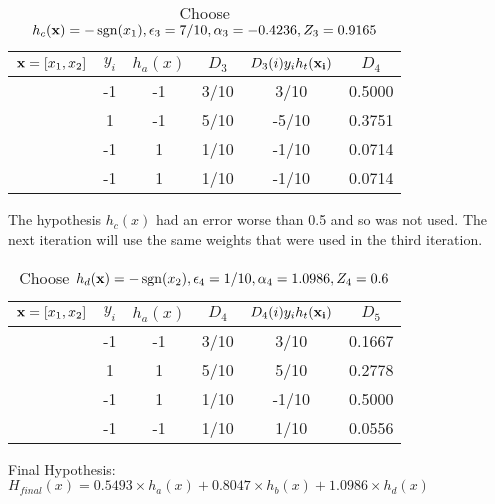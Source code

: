 \begin{table}[H]
  \centering
  \caption{Choose $h_c({\bf x}) = -\operatorname{sgn}(x_1), \epsilon_3 = 7/10, \alpha_3 = -0.4236, Z_3 = 0.9165$}
  \label{tab:Ada1}
  \begin{tabular}{|c|c|c|c|c|c|}
    \hline
    ${\bf x} = [x_1,x_2]$ & $y_i$ & $h_a(x)$ & $D_3$ & $D_{3}(i)y_{i}h_t({\bf x_i})$ & $D_4$ \\ \hline
    [1,1]          &     -1  & -1    & 3/10   & 3/10                          &  0.5000     \\ \hline
    [1,-1]         &    1   & -1    & 5/10   & -5/10                          &    0.3751   \\ \hline
    [-1,-1]        &     -1  & 1    & 1/10   & -1/10                           & 0.0714      \\ \hline
    [-1,1]         &     -1 & 1    & 1/10   & -1/10                           &  0.0714     \\ \hline
  \end{tabular}
\end{table}

The hypothesis $h_c(x)$ had an error worse than 0.5 and so was not used. The next iteration will use the same weights that were used in the third iteration.

\begin{table}[H]
  \centering
  \caption{Choose $h_d({\bf x}) = -\operatorname{sgn}(x_2), \epsilon_4 = 1/10, \alpha_4 = 1.0986, Z_4 = 0.6$}
  \label{tab:Ada1}
  \begin{tabular}{|c|c|c|c|c|c|}
    \hline
    ${\bf x} = [x_1,x_2]$ & $y_i$ & $h_a(x)$ & $D_4$ & $D_{4}(i)y_{i}h_t({\bf x_i})$ & $D_5$ \\ \hline
    [1,1]          &     -1  & -1    & 3/10   & 3/10                          &  0.1667     \\ \hline
    [1,-1]         &    1   & 1    & 5/10   & 5/10                          &    0.2778   \\ \hline
    [-1,-1]        &     -1  & 1    & 1/10   & -1/10                           & 0.5000      \\ \hline
    [-1,1]         &     -1 & -1    & 1/10   & 1/10                           &  0.0556     \\ \hline
  \end{tabular}
\end{table}

Final Hypothesis:
$H_{final}(x) = 0.5493 \times h_a(x) + 0.8047 \times h_b(x) + 1.0986 \times h_d(x)$


